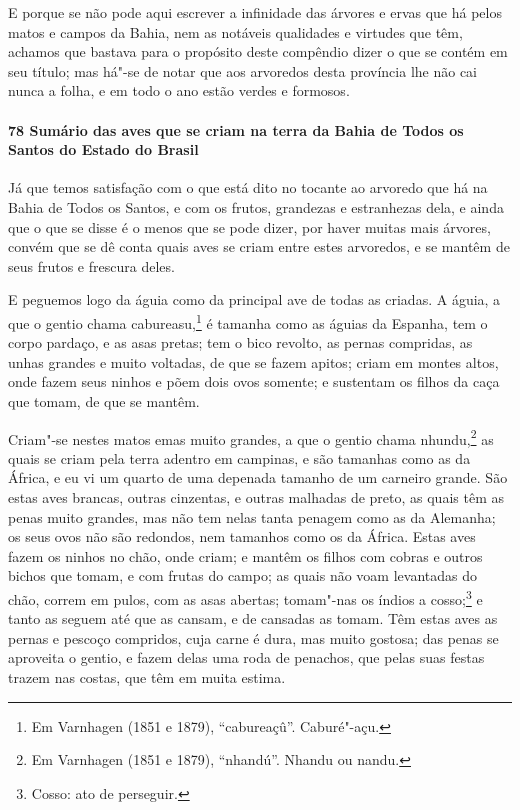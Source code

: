 \begin{linenumbers}
E porque se não pode aqui escrever a infinidade das árvores e ervas que há pelos matos e
campos da Bahia, nem as notáveis qualidades e virtudes que têm, achamos que bastava para o
propósito deste compêndio dizer o que se contém em seu título; mas há"-se de notar que aos
arvoredos desta província lhe não cai nunca a folha, e em todo o ano estão verdes e
formosos.

\paragraph{78 Sumário das aves que se criam na terra da Bahia de Todos os Santos do Estado
do Brasil}\quad
Já que temos satisfação com o que está dito no tocante ao arvoredo que há na Bahia de
Todos os Santos, e com os frutos, grandezas e estranhezas dela, e ainda que o que se disse
é o menos que se pode dizer, por haver muitas mais árvores, convém que se dê conta quais
aves se criam entre estes arvoredos, e se mantêm de seus frutos e frescura deles.

E peguemos logo da águia como da principal ave de todas as criadas. A águia, a que o
gentio chama cabureasu,\footnote{ Em Varnhagen (1851 e 1879), ``cabureaçû''. Caburé"-açu.}
é tamanha como as águias da Espanha, tem o corpo pardaço, e as asas pretas; tem o bico
revolto, as pernas compridas, as unhas grandes e muito voltadas, de que se fazem apitos;
criam em montes altos, onde fazem seus ninhos e põem dois ovos somente; e sustentam os
filhos da caça que tomam, de que se mantêm.

Criam"-se nestes matos emas muito grandes, a que o gentio chama nhundu,\footnote{ Em
Varnhagen (1851 e 1879), ``nhandú''. Nhandu ou nandu.} as quais se criam pela terra
adentro em campinas, e são tamanhas como as da África, e eu vi um quarto de uma depenada
tamanho de um carneiro grande. São estas aves brancas, outras cinzentas, e outras malhadas
de preto, as quais têm as penas muito grandes, mas não tem nelas tanta penagem como as da
Alemanha; os seus ovos não são redondos, nem tamanhos como os da África. Estas aves fazem
os ninhos no chão, onde criam; e mantêm os filhos com cobras e outros bichos que tomam, e
com frutas do campo; as quais não voam levantadas do chão, correm em pulos, com as asas
abertas; tomam"-nas os índios a cosso;\footnote{ Cosso: ato de perseguir.} e tanto as
seguem até que as cansam, e de cansadas as tomam. Têm estas aves as pernas e
pescoço compridos, cuja carne é dura, mas muito gostosa; das penas se aproveita o gentio,
e fazem delas uma roda de penachos, que pelas suas festas trazem nas costas, que têm em
muita estima.


\end{linenumbers}
